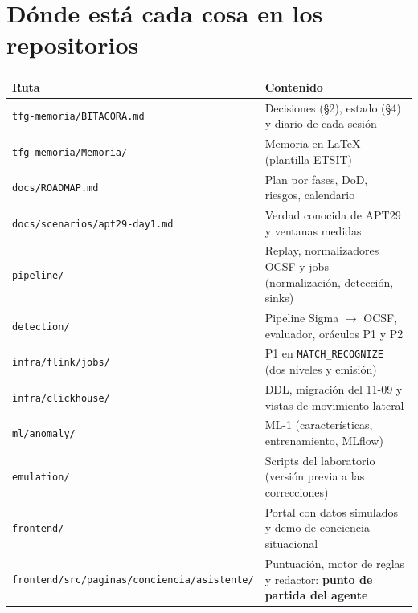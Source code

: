 \documentclass[11pt,a4paper]{article}
\newcommand{\cod}[1]{\texttt{#1}}
\newcommand{\flecha}{$\rightarrow$}
\begin{document}
\section{Dónde está cada cosa en los repositorios}
\begin{center}
\small
\begin{tabularx}{\linewidth}{l X}
\toprule
Ruta & Contenido \\
\midrule
\cod{tfg-memoria/BITACORA.md} & Decisiones (§2), estado (§4) y diario de cada sesión \\
\cod{tfg-memoria/Memoria/} & Memoria en \LaTeX{} (plantilla ETSIT) \\
\cod{docs/ROADMAP.md} & Plan por fases, DoD, riesgos, calendario \\
\cod{docs/scenarios/apt29-day1.md} & Verdad conocida de APT29 y ventanas medidas \\
\cod{pipeline/} & Replay, normalizadores OCSF y jobs (normalización, detección, sinks) \\
\cod{detection/} & Pipeline Sigma \flecha{} OCSF, evaluador, oráculos P1 y P2 \\
\cod{infra/flink/jobs/} & P1 en \cod{MATCH\_RECOGNIZE} (dos niveles y emisión) \\
\cod{infra/clickhouse/} & DDL, migración del 11-09 y vistas de movimiento lateral \\
\cod{ml/anomaly/} & ML-1 (características, entrenamiento, MLflow) \\
\cod{emulation/} & Scripts del laboratorio (versión previa a las correcciones) \\
\cod{frontend/} & Portal con datos simulados y demo de conciencia situacional \\
\cod{frontend/src/paginas/conciencia/asistente/} & Puntuación, motor de reglas y redactor: \textbf{punto de partida del agente} \\
\bottomrule
\end{tabularx}
\end{center}
\end{document}
